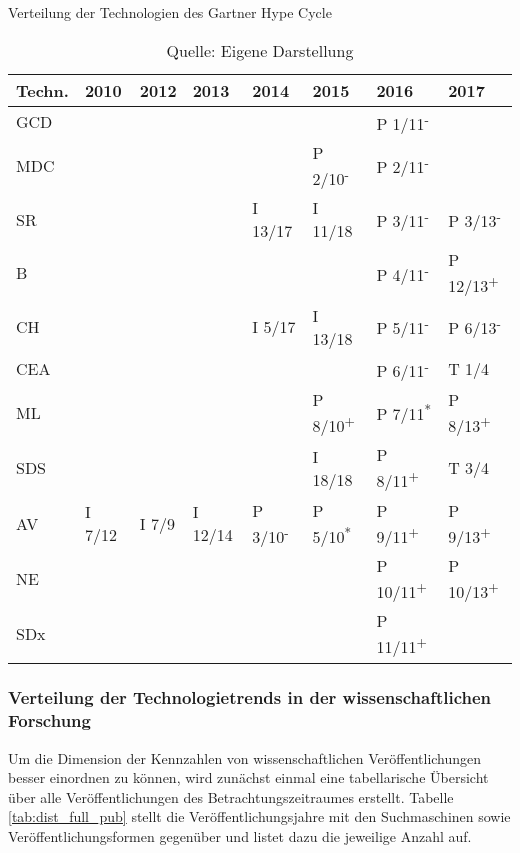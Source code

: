 \begin{table}
	\caption{Verteilung der Technologien des \glqq Gartner Hype Cycle\grqq}
	\selectfont
	\scriptsize
	\centering
	\label{tab:dist_ghc}
	\begin{tabularx}{\linewidth}{XXXXXXXX}
		Techn. & 2010 & 2012 & 2013 & 2014 & 2015 & 2016 & 2017 \\
		\hline
		\acs{GCD} &  &  &  &  &  & P 1/11\textsuperscript{-} &  \\
		\acs{MDC} &  &  &  &  & P 2/10\textsuperscript{-} & P 2/11\textsuperscript{-} &  \\
		\acs{SR} &  &  &  & I 13/17 & I 11/18 & P 3/11\textsuperscript{-} & P 3/13\textsuperscript{-} \\
		\acs{B} &  &  &  &  &  & P 4/11\textsuperscript{-} & P 12/13\textsuperscript{+} \\
		\acs{CH} &  &  &  & I 5/17 & I 13/18 & P 5/11\textsuperscript{-} & P 6/13\textsuperscript{-} \\
		\acs{CEA} &  &  &  &  &  & P 6/11\textsuperscript{-} & T 1/4 \\
		\acs{ML} &  &  &  &  & P 8/10\textsuperscript{+} & P 7/11\textsuperscript{*} & P 8/13\textsuperscript{+} \\
		\acs{SDS} &  &  &  &  & I 18/18 & P 8/11\textsuperscript{+} & T 3/4 \\
		\acs{AV} & I 7/12 & I 7/9 & I 12/14 & P 3/10\textsuperscript{-} & P 5/10\textsuperscript{*} & P 9/11\textsuperscript{+} & P 9/13\textsuperscript{+} \\
		\acs{NE} &  &  &  &  &  & P 10/11\textsuperscript{+} & P 10/13\textsuperscript{+} \\
		\acs{SDx} &  &  &  &  &  & P 11/11\textsuperscript{+} &  \\
		\hline
	\end{tabularx}
\caption*{Quelle: Eigene Darstellung}
\end{table}

\subsubsection{Verteilung der Technologietrends in der wissenschaftlichen Forschung}
Um die Dimension der Kennzahlen von wissenschaftlichen Veröffentlichungen besser einordnen zu können, wird zunächst einmal eine tabellarische Übersicht über alle Veröffentlichungen des Betrachtungszeitraumes erstellt. Tabelle \ref{tab:dist_full_pub} stellt die Veröffentlichungsjahre mit den Suchmaschinen sowie Veröffentlichungsformen gegenüber und listet dazu die jeweilige Anzahl auf.

